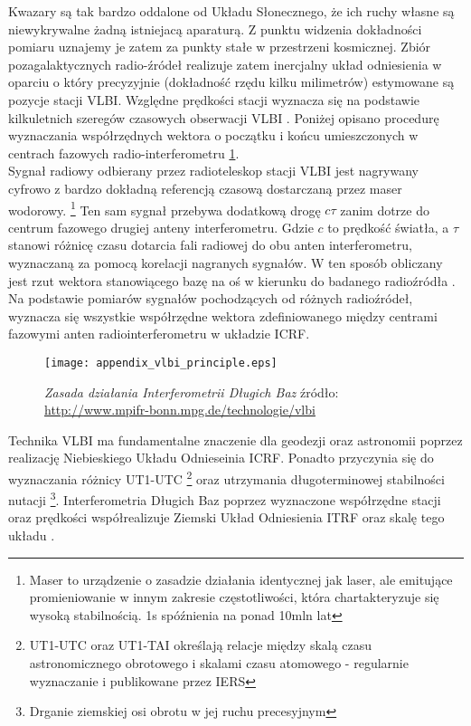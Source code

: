 \indent Kwazary są tak bardzo oddalone od Układu Słonecznego, że ich ruchy własne są niewykrywalne żadną istniejacą aparaturą. Z punktu widzenia dokładności pomiaru 
uznajemy je zatem za punkty stałe w przestrzeni kosmicznej. Zbiór pozagalaktycznych radio-źródeł realizuje zatem inercjalny układ odniesienia w oparciu o który precyzyjnie
(dokładność rzędu kilku milimetrów) estymowane są pozycje stacji VLBI. Względne prędkości stacji wyznacza się na podstawie kilkuletnich szeregów czasowych obserwacji VLBI 
\cite[][strona 27]{ggos}. Poniżej opisano procedurę wyznaczania współrzędnych wektora o początku i końcu umieszczonych w centrach fazowych radio-interferometru 
\ref{fig:vlbi_principle}.\\
\indent Sygnał radiowy odbierany przez radioteleskop stacji VLBI jest nagrywany cyfrowo z bardzo dokładną referencją czasową dostarczaną przez maser wodorowy. 
\footnote{Maser to urządzenie o zasadzie działania identycznej jak laser, ale emitujące promieniowanie w innym zakresie częstotliwości, która chartakteryzuje się 
wysoką stabilnością. 1s spóźnienia na ponad 10mln lat}
Ten sam sygnał przebywa dodatkową drogę $c\tau$ zanim dotrze do centrum fazowego drugiej anteny interferometru. Gdzie $c$ to prędkość światła, a $\tau$ stanowi 
różnicę czasu dotarcia fali radiowej do obu anten interferometru, wyznaczaną za pomocą korelacji nagranych sygnałów. W ten sposób obliczany jest rzut wektora stanowiącego bazę
na oś w kierunku do badanego radioźródła \cite[][strona 27]{ggos}. 
Na podstawie pomiarów sygnałów pochodzących od różnych radioźródeł, wyznacza się wszystkie współrzędne wektora zdefiniowanego między centrami fazowymi anten 
radiointerferometru w układzie ICRF. 
\begin{figure}[H]
\centering
\texttt{[image: appendix\_vlbi\_principle.eps]}
\caption{\textit{Zasada działania Interferometrii Długich Baz} źródło: \protect\url{http://www.mpifr-bonn.mpg.de/technologie/vlbi}}
\label{fig:vlbi_principle}
\end{figure}
\indent Technika VLBI ma fundamentalne znaczenie dla geodezji oraz astronomii poprzez realizację Niebieskiego Układu Odnieseinia ICRF.
Ponadto przyczynia się do wyznaczania różnicy UT1-UTC \footnote{UT1-UTC oraz UT1-TAI określają relacje między skalą czasu
astronomicznego obrotowego i skalami czasu atomowego - regularnie wyznaczanie i publikowane przez IERS} oraz utrzymania długoterminowej stabilności nutacji 
\footnote{Drganie ziemskiej osi obrotu w jej ruchu precesyjnym}.
Interferometria Długich Baz poprzez wyznaczone współrzędne stacji oraz prędkości współrealizuje Ziemski Układ Odniesienia ITRF oraz skalę tego układu
\cite[][strona 29]{ggos}.

